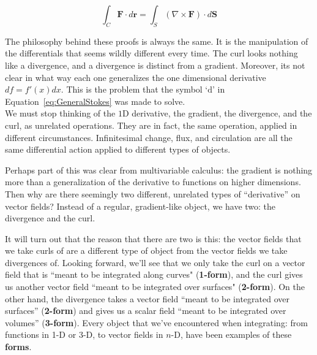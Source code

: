 	\begin{equation}
		\int_C \mathbf{F} \cdot d\mathbf r = \int_S (\nabla \times \mathbf{F}) \cdot d\mathbf S 
	\end{equation}
	
	The philosophy behind these proofs is always the same. It is the manipulation of the differentials that seems wildly different every time. The curl looks nothing like a divergence, and a divergence is distinct from a gradient. Moreover, its not clear in what way each one generalizes the one dimensional derivative $df = f'(x) dx$. This is the problem that the symbol `$\mathrm d$' in Equation~\eqref{eq:GeneralStokes} was made to solve.\\
	
	We must stop thinking of the $1$D derivative, the gradient, the divergence, and the curl, as unrelated operations. They are in fact, the same operation, applied in different circumstances. Infinitesimal change, flux, and circulation are all the same differential action applied to different types of objects. 
	
	Perhaps part of this was clear from multivariable calculus: the gradient is nothing more than a generalization of the derivative to functions on higher dimensions. Then why are there seemingly two different, unrelated types of ``derivative'' on vector fields? Instead of a regular, gradient-like object, we have two: the divergence and the curl. 
	
	It will turn out that the reason that there are two is this: the vector fields that we take curls of are a different type of object from the vector fields we take divergences of. Looking forward, we'll see that we only take the curl on a vector field that is ``meant to be integrated along curves" (\textbf{1-form}), and the curl gives us another vector field ``meant to be integrated over surfaces" (\textbf{2-form}). On the other hand, the divergence takes a vector field ``meant to be integrated over surfaces'' (\textbf{2-form}) and gives us a scalar field ``meant to be integrated over volumes'' (\textbf{3-form}). Every object that we've encountered when integrating: from functions in 1-D or 3-D, to vector fields in $n$-D, have been examples of these \textbf{forms}.  \\
	

